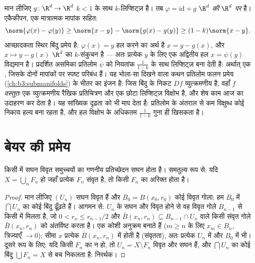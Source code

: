 \begin{example}[तत्समक का विक्षोभ]
\label{ex:b3:complete:perturbident}
मान लीजिए $g \colon \R^d \to \R^d$ $k < 1$ के साथ $k$-लिप्शिट्ज़ है। तब $\varphi = \mathrm{id} + g$
\emph{$\R^d$ की $\R^d$ पर } है। एकैकीपन, एक मात्रात्मक
मापांक सहित:
\[
\norm{\varphi(x) - \varphi(y)} \geq \norm{x - y} -
\norm{g(x) - g(y)} \geq (1 - k)\norm{x - y} .
\]
आच्छादकता स्थिर बिंदु प्रमेय है: $\varphi(x) = y$ हल करने का अर्थ है $x = y - g(x)$,
और $x \mapsto y -
g(x)$  $\R^d$ का $k$-संकुचन है --- अतः प्रत्येक $y$ के
लिए एक अद्वितीय हल $x = \psi(y)$ विद्यमान है। प्रदर्शित असमिका प्रतिलोम
$\psi$ को नियतांक $\frac1{1-k}$ के साथ लिप्शिट्ज़ बना देती है: अर्थात् एक
, जिसके दोनों मापांकों पर स्पष्ट परिबंध हैं। यह
भोला-सा दिखने वाला कथन प्रतिलोम फलन प्रमेय (\cref{ch:b3:submanifolds}) के भीतर का
इंजन है: जिस बिंदु के निकट $Df$ व्युत्क्रमणीय है, वहाँ $f$
\emph{वस्तुतः} एक व्युत्क्रमणीय रैखिक प्रतिचित्रण और एक छोटा
लिप्शिट्ज़ विक्षोभ है, और शेष काम आज का उदाहरण कर देता है। यह
सांख्यिक दृढ़ता को भी माप देता है: प्रतिलोम के अंतराल से कम
विक्षुब्ध कोई निकाय हल्य बना रहता है, और हल विक्षोभ के अधिकतम
$\frac{1}{1-k}$ गुना ही खिसकता है।
\end{example}

\section{बेयर की प्रमेय}

\begin{theorem}[बेयर]\label{thm:b3:complete:baire}
किसी  में सघन विवृत समुच्चयों का गणनीय
प्रतिच्छेदन सघन होता है। समतुल्य रूप से: यदि $X = \bigcup_{n}F_n$ हो जहाँ
प्रत्येक $F_n$ संवृत है, तो किसी $F_n$ का  अरिक्त
होता है।
\end{theorem}

\begin{proof}
मान लीजिए $(U_n)$ सघन विवृत हैं और $B_0 = B(x_0, r_0)$ कोई विवृत गोला; हम $B_0$
में $\bigcap U_n$ का कोई बिंदु ढूँढ़ते हैं। आगमन से: $U_{n}$ के सघन और
विवृत होने से वह विवृत गोले $B_{n-1}$ से किसी  में
मिलता है, जो $0 < r_n \leq r_{n-1}/2$ और $\bar B(x_n, r_n) \subseteq
B_{n-1}\cap U_n$ वाले किसी संवृत गोले $\bar B(x_n, r_n)$ को
अंतर्विष्ट करता है।  एक कोशी अनुक्रम बनाते हैं ($m \geq n$ के
लिए $x_m \in
B_n$, त्रिज्याएँ $\to 0$); सीमा $x$ प्रत्येक $\bar B(x_n, r_n)$ में होती
है (संवृतता), अतः प्रत्येक $U_n$ में और $B_0$ में भी। दूसरे रूप
के लिए: यदि किसी $F_n$ का  न हो, तो $U_n = X \setminus F_n$ विवृत और सघन
हैं, और $\bigcap U_n$ का कोई बिंदु $\bigcup F_n = X$ से बच निकलता है: निरर्थक।
\end{proof}

